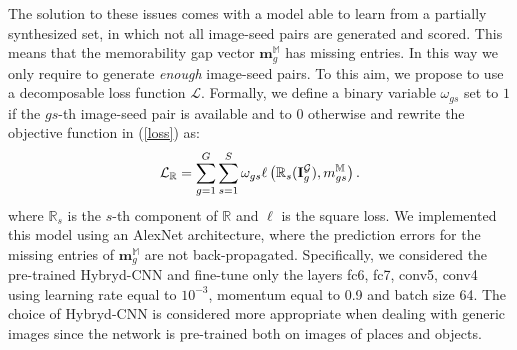 \documentclass{sig-alternate-05-2015}
\begin{document}
The solution to these issues comes with a model able to learn from a partially synthesized set, in which not all image-seed pairs are generated and scored. This means that the memorability gap vector $\mathbf{m}^{\mathbb M}_g$ has  missing entries. In this way we only require to generate \textit{enough} image-seed pairs. To this aim, we propose to use a decomposable loss function $\mathcal{L}$. Formally, we define a binary variable $\omega_{gs}$ set to $1$ if the 
$gs$-th image-seed pair is available and to $0$ otherwise and rewrite the objective function in (\ref{loss}) as:
\begin{equation}{\cal L}_\mathbb{R} = \sum_{g=1}^G \sum_{s=1}^S \omega_{gs}\ell\left(\mathbb{R}_s(\mathbf{I}_g^{\cal G}),m_{gs}^\mathbb{M}\right).
\end{equation}
where $\mathbb{R}_s$ is the $s$-th component of $\mathbb{R}$ and $\ell$ is the square loss.
We implemented this model using an AlexNet architecture, where the prediction errors for the missing entries of $\mathbf{m}^{\mathbb{M}}_g$ are not back-propagated. 
Specifically, we considered the pre-trained Hybryd-CNN and fine-tune only the layers fc6, fc7, conv5, conv4 using learning rate equal to $10^{-3}$, momentum equal to 0.9 and batch size 64. The choice of  Hybryd-CNN is considered more appropriate when dealing with generic images since the network is pre-trained both on images of places and objects.
\end{document}
